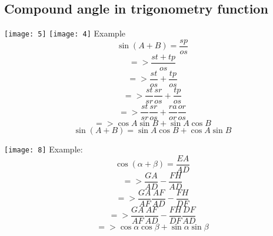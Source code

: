 \subsection{Compound angle in trigonometry function}
\texttt{[image: 5]}
\texttt{[image: 4]}
\newline
Example
\begin{equation}
\sin(A+B)=\frac{sp}{os}
\end{equation}
\begin{displaymath}
=>\frac{st+tp}{os}
\end{displaymath}
\begin{displaymath}
=>\frac{st}{os}+\frac{tp}{os}
\end{displaymath}
\begin{displaymath}
=>\frac{st}{sr}\frac{sr}{os}+\frac{tp}{os}
\end{displaymath}
\begin{displaymath}
=>\frac{st}{sr}\frac{sr}{os}+\frac{ra}{or}\frac{or}{os}
\end{displaymath}
\begin{displaymath}
=> \cos A\sin B+\sin A\cos B
\end{displaymath}
\begin{equation}
\sin(A+B) = \sin A\cos B+\cos A\sin B
\end{equation}

\texttt{[image: 8]}
\newline
Example:
\newline
\begin{displaymath}
\cos(\alpha+\beta) = \frac{EA}{AD}
\end{displaymath}
\begin{displaymath}
=> \frac{GA}{AD}-\frac{FH}{AD}
\end{displaymath}
\begin{displaymath}
=> \frac{GA}{AF}\frac{AF}{AD}-\frac{FH}{DF}
\end{displaymath}
\begin{displaymath}
=> \frac{GA}{AF}\frac{AF}{AD}-\frac{FH}{DF}\frac{DF}{AD}
\end{displaymath}
\begin{equation}
=> \cos\alpha \cos\beta + \sin\alpha \sin\beta
\end{equation}





